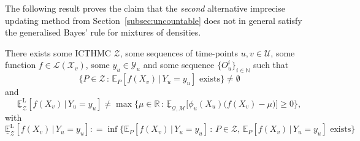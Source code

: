 \documentclass[twoside,11pt]{article}
\newcommand{\nats}{\mathbb{N}}
\newcommand{\reals}{\mathbb{R}}
\newcommand{\states}{\mathcal{X}}
\newcommand{\observs}{\mathcal{Y}}
\newcommand{\lexp}{\underline{\mathbb{E}}_{\rateset,\mathcal{M}}}
\newcommand{\gambles}{\mathcal{L}}
\newcommand{\rateset}{\mathcal{Q}}
\newcommand{\coloneqq}{:\!=}
\begin{document}
The following result proves the claim that the \emph{second} alternative imprecise updating method from Section~\ref{subsec:uncountable} does not in general satisfy the generalised Bayes' rule for mixtures of densities.
\begin{corollary}
There exists some ICTHMC $\mathcal{Z}$, some sequences of time-points $u,v\in\mathcal{U}$, some function $f\in\gambles(\states_v)$, some $y_u\in\observs_u$ and some sequence $\{O_u^i\}_{i\in\nats}$ such that
\begin{equation*}
\{P\in\mathcal{Z}\,:\,\text{$\mathbb{E}_P[f(X_v)\,\vert\,Y_u=y_u]$ exists}\}\neq\emptyset
\end{equation*}
and
\begin{equation*}
\underline{\mathbb{E}}_\mathcal{Z}^\mathrm{L}[f(X_v)\,\vert\, Y_u=y_u] \neq \max\{\mu\in\reals\,:\,\lexp\bigl[\phi_u(X_u)\bigl(f(X_v)-\mu\bigr)\bigr]\geq 0\},
\end{equation*}
with
\begin{equation*}
\underline{\mathbb{E}}_\mathcal{Z}^\mathrm{L}[f(X_v)\,\vert\, Y_u=y_u]\coloneqq \inf\bigl\{\mathbb{E}_P[f(X_v)\,\vert\,Y_u=y_u]\,:\,P\in\mathcal{Z},\,\text{$\mathbb{E}_P[f(X_v)\,\vert\,Y_u=y_u]$ exists}\bigr\}
\end{equation*}
\end{corollary}
\end{document}
